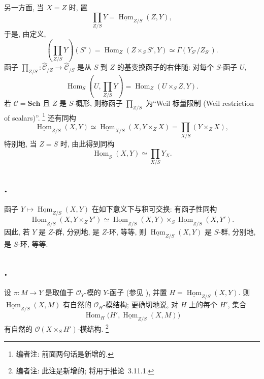 另一方面, 当 \(X=Z\) 时, 置
\begin{equation}
  \prod_{Z/S}Y
  =\underline{\operatorname{Hom}}_{Z/S}(Z,Y),
  \tag{5}\label{sga3:ii:section:1:equation:5}
\end{equation}
于是, 由定义,
\[
  \left(\prod_{Z/S}Y\right)(S')
  =\operatorname{Hom}_Z(Z\times_SS',Y)
  \simeq \Gamma(Y_{S'}/Z_{S'}).
\]
函子
\(\prod_{Z/S}:\widehat{\mathscr C}_{/Z}\to
\widehat{\mathscr C}_{/S}\) 是从 \(S\) 到 \(Z\) 的基变换函子的右伴随:
对每个 \(S\)-函子 \(U\),
\[
  \operatorname{Hom}_S\left(U,\prod_{Z/S}Y\right)
  =\operatorname{Hom}_Z(U\times_SZ,Y).
\]
若 \(\mathscr C=\mathbf{Sch}\) 且 \(Z\) 是 \(S\)-概形,
则称函子 \(\prod_{Z/S}\) 为``Weil 标量限制 (Weil restriction of scalars)''.
\footnote{编者注: 前面两句话是新增的.}
还有同构
\begin{equation}
  \underline{\operatorname{Hom}}_{Z/S}(X,Y)
  \simeq
  \underline{\operatorname{Hom}}_{X/S}(X,Y\times_ZX)
  =\prod_{X/S}(Y\times_ZX),
  \tag{6}\label{sga3:ii:section:1:equation:6}
\end{equation}
特别地, 当 \(Z=S\) 时, 由此得到同构
\begin{equation}
  \underline{\operatorname{Hom}}_S(X,Y)
  \simeq \prod_{X/S}Y_X.
  \tag{7}\label{sga3:ii:section:1:equation:7}
\end{equation}

\subsection*{.}
函子
\(Y\mapsto\underline{\operatorname{Hom}}_{Z/S}(X,Y)\) 在如下意义下与积可交换:
有函子性同构
\[
  \underline{\operatorname{Hom}}_{Z/S}(X,Y\times_ZY')
  \simeq
  \underline{\operatorname{Hom}}_{Z/S}(X,Y)
  \times_S
  \underline{\operatorname{Hom}}_{Z/S}(X,Y').
  \tag{*}\label{sga3:ii:section:1:equation:star}
\]
因此, 若 \(Y\) 是 \(Z\)-群, 分别地, 是 \(Z\)-环,
等等, 则 \(\underline{\operatorname{Hom}}_{Z/S}(X,Y)\) 是
\(S\)-群, 分别地, 是 \(S\)-环, 等等.

\subsection*{.}
设 \(\pi:M\to Y\) 是取值于 \(\mathcal O_Y\)-模的 \(Y\)-函子
(参见 ), 并置
\(H=\underline{\operatorname{Hom}}_{Z/S}(X,Y)\). 则
\(\underline{\operatorname{Hom}}_{Z/S}(X,M)\) 有自然的
\(\mathcal O_H\)-模结构; 更确切地说, 对 \(H\) 上的每个 \(H'\), 集合
\[
  \operatorname{Hom}_H
    \bigl(H',\underline{\operatorname{Hom}}_{Z/S}(X,M)\bigr)
\]
有自然的 \(\mathcal O(X\times_SH')\)-模结构.
\footnote{编者注: 此注是新增的; 将用于推论~3.11.1.}


